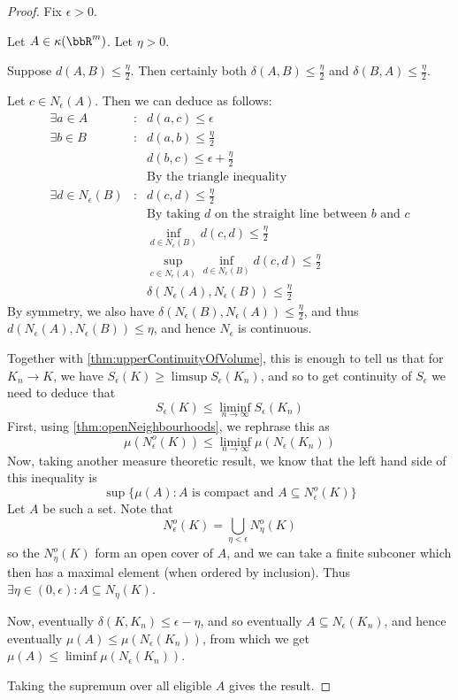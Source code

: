 \documentclass[a4paper,11pt]{article}
\begin{document}
\begin{proof}
Fix $\epsilon>0$.

Let $A\in\kappa(\bbR^m)$.  Let $\eta>0$.

Suppose $d(A,B)\leq\frac{\eta}{2}$.  Then certainly both
$\delta(A,B)\leq\frac{\eta}{2}$ and $\delta(B,A)\leq\frac{\eta}{2}$.

Let $c\in N_\epsilon(A)$.  Then we can deduce as follows:
%
\begin{eqnarray*}
\exists a\in A &:& d(a,c)\leq\epsilon \\
\exists b\in B &:& d(a,b)\leq\frac{\eta}{2} \\
&& d(b,c)\leq\epsilon+\frac{\eta}{2} \\
&& \textrm{By the triangle inequality} \\
\exists d\in N_\epsilon(B) &:& d(c,d)\leq\frac{\eta}{2} \\
&& \textrm{By taking $d$ on the straight line between $b$ and $c$} \\
&&\inf_{d\in N_\epsilon(B)}d(c,d)\leq\frac{\eta}{2} \\
&&\sup_{c\in N_\epsilon(A)}\inf_{d\in N_\epsilon(B)}d(c,d)\leq\frac{\eta}{2} \\
&&\delta(N_\epsilon(A),N_\epsilon(B))\leq\frac{\eta}{2}
\end{eqnarray*}
%
By symmetry, we also have
$\delta(N_\epsilon(B),N_\epsilon(A))\leq\frac{\eta}{2}$, and thus
$d(N_\epsilon(A),N_\epsilon(B))\leq\eta$, and hence $N_\epsilon$ is continuous.

Together with \ref{thm:upperContinuityOfVolume},
this is enough to tell us that for
$K_n\to K$, we have $S_\epsilon(K)\geq\limsup S_\epsilon(K_n)$, and so to get
continuity of $S_\epsilon$ we need to deduce that
\[
S_\epsilon(K)\leq\liminf_{n\to\infty} S_\epsilon(K_n)
\]
First, using \ref{thm:openNeighbourhoods}, we rephrase this as
\[
\mu(N_\epsilon^o(K))\leq\liminf_{n\to\infty}\mu(N_\epsilon(K_n))
\]
Now, taking another measure theoretic result, we know that the left hand side
of this inequality is
\[
\sup\{\mu(A):A\textrm{ is compact and }A\subseteq N_\epsilon^o(K)\}
\]
Let $A$ be such a set.  Note that
\[
N_\epsilon^o(K)=\bigcup_{\eta<\epsilon}N_\eta^o(K)
\]
so the $N_\eta^o(K)$ form an open cover of $A$, and we can take a finite
subconer which then has a maximal element (when ordered by inclusion).  Thus
$\exists\eta\in(0,\epsilon):A\subseteq N_\eta(K)$.

Now, eventually $\delta(K,K_n)\leq\epsilon-\eta$, and so eventually
$A\subseteq N_\epsilon(K_n)$, and hence eventually
$\mu(A)\leq\mu(N_\epsilon(K_n))$, from which we get
$\mu(A)\leq\liminf\mu(N_\epsilon(K_n))$.

Taking the supremum over all eligible $A$ gives the result.
\end{proof}
\end{document}
